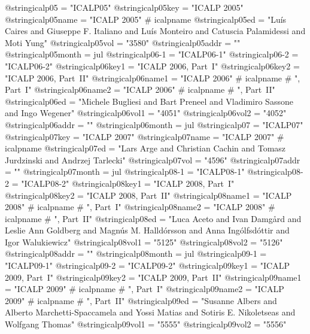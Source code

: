 @string{icalp05 =               "ICALP05"}
@string{icalp05key =            "ICALP 2005"}
@string{icalp05name =           "ICALP 2005" # icalpname}
@string{icalp05ed =             "Lu{\'i}s Caires and Giuseppe F. Italiano and Lu{\'i}s Monteiro and Catuscia Palamidessi and Moti Yung"}
@string{icalp05vol =            "3580"}
@string{icalp05addr =           ""}
@string{icalp05month =          jul}
@string{icalp06-1 =             "ICALP06-1"}
@string{icalp06-2 =             "ICALP06-2"}
@string{icalp06key1 =           "ICALP 2006, Part~I"}
@string{icalp06key2 =           "ICALP 2006, Part~II"}
@string{icalp06name1 =          "ICALP 2006" # icalpname # ", Part~I"}
@string{icalp06name2 =          "ICALP 2006" # icalpname # ", Part~II"}
@string{icalp06ed =             "Michele Bugliesi and Bart Preneel and Vladimiro Sassone and Ingo Wegener"}
@string{icalp06vol1 =           "4051"}
@string{icalp06vol2 =           "4052"}
@string{icalp06addr =           ""}
@string{icalp06month =          jul}
@string{icalp07 =               "ICALP07"}
@string{icalp07key =            "ICALP 2007"}
@string{icalp07name =           "ICALP 2007" # icalpname}
@string{icalp07ed =             "Lars Arge and Christian Cachin and Tomasz Jurdzinski and Andrzej Tarlecki"}
@string{icalp07vol =            "4596"}
@string{icalp07addr =           ""}
@string{icalp07month =          jul}
@string{icalp08-1 =             "ICALP08-1"}
@string{icalp08-2 =             "ICALP08-2"}
@string{icalp08key1 =           "ICALP 2008, Part~I"}
@string{icalp08key2 =           "ICALP 2008, Part~II"}
@string{icalp08name1 =          "ICALP 2008" # icalpname # ", Part~I"}
@string{icalp08name2 =          "ICALP 2008" # icalpname # ", Part~II"}
@string{icalp08ed =             "Luca Aceto and Ivan Damg{\aa}rd and Leslie Ann Goldberg and Magn{\'u}s M. Halld{\'o}rsson and Anna Ing{\'o}lfsd{\'o}ttir and Igor Walukiewicz"}
@string{icalp08vol1 =           "5125"}
@string{icalp08vol2 =           "5126"}
@string{icalp08addr =           ""}
@string{icalp08month =          jul}
@string{icalp09-1 =             "ICALP09-1"}
@string{icalp09-2 =             "ICALP09-2"}
@string{icalp09key1 =           "ICALP 2009, Part~I"}
@string{icalp09key2 =           "ICALP 2009, Part~II"}
@string{icalp09name1 =          "ICALP 2009" # icalpname # ", Part~I"}
@string{icalp09name2 =          "ICALP 2009" # icalpname # ", Part~II"}
@string{icalp09ed =             "Susanne Albers and Alberto Marchetti-Spaccamela and Yossi Matias and Sotiris E. Nikoletseas and Wolfgang Thomas"}
@string{icalp09vol1 =           "5555"}
@string{icalp09vol2 =           "5556"}
